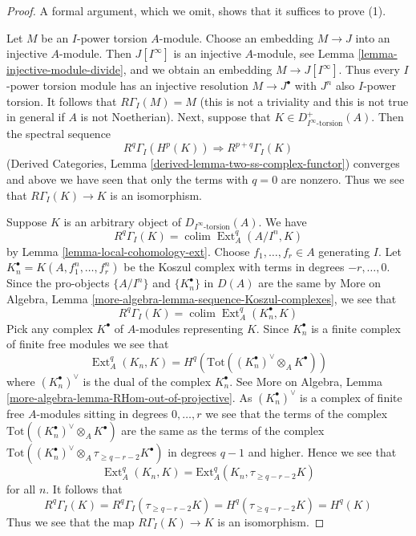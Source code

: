 \documentclass{stacks-project}
\theoremstyle{plain}
\theoremstyle{definition}
\theoremstyle{remark}
\numberwithin{equation}{subsection}
\def\colim{\mathop{\mathrm{colim}}\nolimits}
\def\Ext{\mathop{\mathrm{Ext}}\nolimits}
\begin{document}
\begin{proof}
A formal argument, which we omit, shows that it suffices to prove (1).

\medskip\noindent
Let $M$ be an $I$-power torsion $A$-module. Choose an embedding
$M \to J$ into an injective $A$-module. Then $J[I^\infty]$ is
an injective $A$-module, see Lemma \ref{lemma-injective-module-divide},
and we obtain an embedding $M \to J[I^\infty]$.
Thus every $I$-power torsion module has an injective resolution
$M \to J^\bullet$ with $J^n$ also $I$-power torsion. It follows
that $R\Gamma_I(M) = M$ (this is not a triviality and this is not
true in general if $A$ is not Noetherian). Next, suppose that
$K \in D_{I^\infty\text{-torsion}}^+(A)$. Then the spectral sequence
$$
R^q\Gamma_I(H^p(K)) \Rightarrow R^{p + q}\Gamma_I(K)
$$
(Derived Categories, Lemma \ref{derived-lemma-two-ss-complex-functor})
converges and above we have seen that only the terms with $q = 0$
are nonzero. Thus we see that $R\Gamma_I(K) \to K$ is an isomorphism.

\medskip\noindent
Suppose $K$ is an arbitrary object of $D_{I^\infty\text{-torsion}}(A)$.
We have
$$
R^q\Gamma_I(K) = \colim \Ext^q_A(A/I^n, K)
$$
by Lemma \ref{lemma-local-cohomology-ext}. Choose $f_1, \ldots, f_r \in A$
generating $I$. Let $K_n^\bullet = K(A, f_1^n, \ldots, f_r^n)$ be the
Koszul complex with terms in degrees $-r, \ldots, 0$. Since the
pro-objects $\{A/I^n\}$ and $\{K_n^\bullet\}$ in $D(A)$ are the same by
More on Algebra, Lemma \ref{more-algebra-lemma-sequence-Koszul-complexes},
we see that
$$
R^q\Gamma_I(K) = \colim \Ext^q_A(K_n^\bullet, K)
$$
Pick any complex $K^\bullet$ of $A$-modules representing $K$.
Since $K_n^\bullet$ is a finite complex of finite free modules we see
that
$$
\Ext^q_A(K_n, K) =
H^q(\text{Tot}((K_n^\bullet)^\vee \otimes_A K^\bullet))
$$
where $(K_n^\bullet)^\vee$ is the dual of the complex $K_n^\bullet$.
See More on Algebra, Lemma \ref{more-algebra-lemma-RHom-out-of-projective}.
As $(K_n^\bullet)^\vee$ is a complex of finite free $A$-modules sitting
in degrees $0, \ldots, r$ we see that the terms of the complex
$\text{Tot}((K_n^\bullet)^\vee \otimes_A K^\bullet)$ are the
same as the terms of the complex
$\text{Tot}((K_n^\bullet)^\vee \otimes_A \tau_{\geq q - r - 2} K^\bullet)$
in degrees $q - 1$ and higher. Hence we see that
$$
\Ext^q_A(K_n, K) = \text{Ext}^q_A(K_n, \tau_{\geq q - r - 2}K)
$$
for all $n$. It follows that
$$
R^q\Gamma_I(K) = R^q\Gamma_I(\tau_{\geq q - r - 2}K) =
H^q(\tau_{\geq q - r - 2}K) = H^q(K)
$$
Thus we see that the map $R\Gamma_I(K) \to K$ is an isomorphism.
\end{proof}
\end{document}
